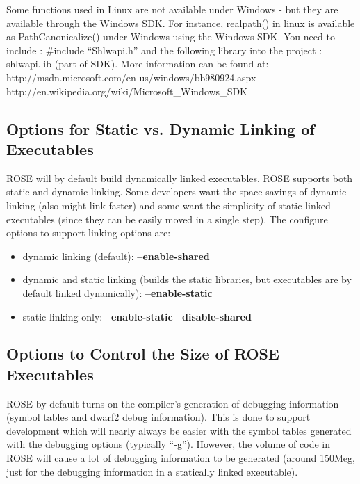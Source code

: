 Some functions used in Linux are not available under Windows - but they are available through the Windows SDK. For instance, realpath() in linux is available as PathCanonicalize() under Windows using the Windows SDK. You need to include : \#include ``Shlwapi.h'' and the following library into the project : shlwapi.lib (part of SDK). More information can be found at: http://msdn.microsoft.com/en-us/windows/bb980924.aspx http://en.wikipedia.org/wiki/Microsoft\_Windows\_SDK





\subsection{Options for Static vs. Dynamic Linking of Executables}
\label{linking_options}

   ROSE will by default build dynamically linked executables. ROSE
supports both static and dynamic linking.  Some developers want the
space savings of dynamic linking (also might link faster) and some
want the simplicity of static linked executables (since they can be
easily moved in a single step).  The configure options to support
linking options are:
\begin{itemize}
     \item dynamic linking (default): {\bf --enable-shared}
     \item dynamic and static linking (builds the static libraries, but executables are by
           default linked dynamically): {\bf --enable-static}
     \item static linking only:  {\bf --enable-static --disable-shared}
\end{itemize}



\subsection{Options to Control the Size of ROSE Executables}

   ROSE by default turns on the compiler's generation of debugging information
(symbol tables and dwarf2 debug information). 
This is done to support development which will nearly always be easier with
the symbol tables generated with the debugging options (typically ``-g'').
However, the volume of code in ROSE will cause a lot of debugging information
to be generated (around 150Meg, just for the debugging information in a 
statically linked executable).

